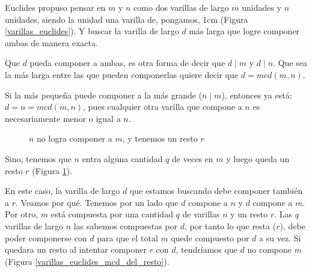 \documentclass[12pt, a4paper, openany, fleqn]{book}
\begin{document}
    Euclides propuso pensar en $m$ y $n$ como dos varillas de largo $m$ unidades y $n$ unidades, siendo la unidad una varilla de, pongamos, 1cm (Figura \ref{varillas_euclides}).
    Y buscar la varilla de largo $d$ más larga que logre componer ambas de manera exacta.

    Que $d$ pueda componer a ambas, es otra forma de decir que $d \mid m$ y $d \mid n$. Que sea la más larga entre las que pueden componerlas quiere decir que $d = mcd(m,n)$.

    Si la más pequeña puede componer a la más grande ($n \mid m$), entonces ya está: $d=n=mcd(m,n)$, pues cualquier otra varilla que compone a $n$ es necesariamente menor o igual a $n$.

    \begin{figure}[h]
        \centering
        \caption{$n$ no logra componer a $m$, y tenemos un resto $r$} \label{varillas_euclides_resto}
    \end{figure}

    Sino, tenemos que $n$ entra alguna cantidad $q$ de veces en $m$ y luego queda un resto $r$ (Figura \ref{varillas_euclides_resto}).

    En este caso, la varilla de largo $d$ que estamos buscando debe componer también a $r$. Veamos por qué. Tenemos por un lado que $d$ compone a $n$ y $d$ compone a $m$. Por otro, $m$ está compuesta por una cantidad $q$ de varillas $n$ y un resto $r$.
    Las $q$ varillas de largo $n$ las sabemos compuestas por $d$, por tanto lo que resta ($r$), debe poder componerse con $d$ para que el total $m$ quede compuesto por $d$ a su vez. Si quedara un resto al intentar componer $r$ con $d$, tendríamos que $d$ no compone $m$ (Figura \ref{varillas_euclides_mcd_del_resto}).
\end{document}
